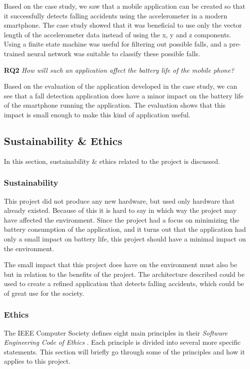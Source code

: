 \documentclass[12pt, a4paper, onecolumn]{article}
\begin{document}
	Based on the case study, we saw that a mobile application can be created so that it successfully detects falling accidents using the accelerometer in a modern smartphone. The case study showed that it was beneficial to use only the vector length of the accelerometer data instead of using the x, y and z components. Using a finite state machine was useful for filtering out possible falls, and a pre-trained neural network was suitable to classify these possible falls.
	
	\textbf{RQ2} \textit{How will such an application affect the battery life of the mobile phone?}
	
	Based on the evaluation of the application developed in the case study, we can see that a fall detection application does have a minor impact on the battery life of the smartphone running the application. The evaluation shows that this impact is small enough to make this kind of application useful.
	
	\subsection{Sustainability \& Ethics}
	
	In this section, sustainability \& ethics related to the project is discussed.
	
	\subsubsection{Sustainability}
	
	This project did not produce any new hardware, but used only hardware that already existed. Because of this it is hard to say in which way the project may have affected the environment. Since the project had a focus on minimizing the battery consumption of the application, and it turns out that the application had only a small impact on battery life, this project should have a minimal impact on the environment.
	
	The small impact that this project does have on the environment must also be but in relation to the benefits of the project. The architecture described could be used to create a refined application that detects falling accidents, which could be of great use for the society.
	
	\subsubsection{Ethics}
	
	The IEEE Computer Society defines eight main principles in their \textit{Software Engineering Code of Ethics} \cite{ieee-ethics}. Each principle is divided into several more specific statements.
	This section will briefly go through some of the principles and how it applies to this project.
	
\end{document}
